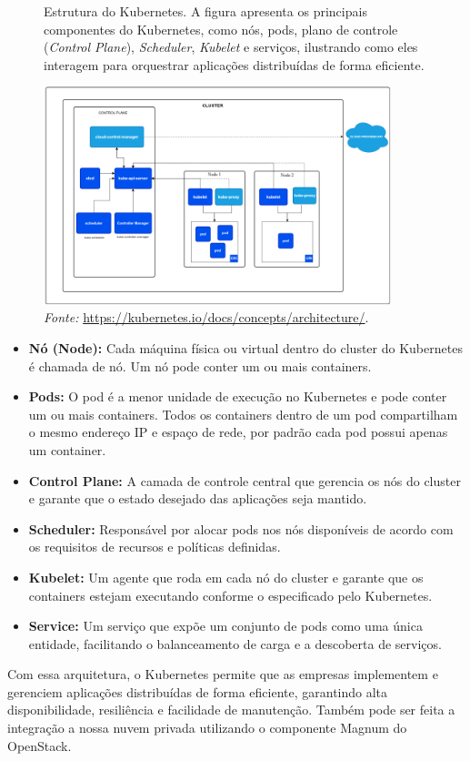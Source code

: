 \begin{figure}[htbp]
  \centering
  \caption{Estrutura do Kubernetes. A figura apresenta os principais componentes do Kubernetes, como nós, pods, plano de controle (\textit{Control Plane}), \textit{Scheduler}, \textit{Kubelet} e serviços, ilustrando como eles interagem para orquestrar aplicações distribuídas de forma eficiente.}
  \includegraphics[width=0.9\textwidth]{images/structure_kubernets.png}
  \caption*{\textit{Fonte:} \url{https://kubernetes.io/docs/concepts/architecture/}.}
  \label{fig:structure_kubernets}
\end{figure}


\begin{itemize}
    \item \textbf{Nó (Node):} Cada máquina física ou virtual dentro do cluster do Kubernetes é chamada de nó. Um nó pode conter um ou mais containers.
    \item \textbf{Pods:} O pod é a menor unidade de execução no Kubernetes e pode conter um ou mais containers. Todos os containers dentro de um pod compartilham o mesmo endereço IP e espaço de rede, por padrão cada pod possui apenas um container.
    \item \textbf{Control Plane:} A camada de controle central que gerencia os nós do cluster e garante que o estado desejado das aplicações seja mantido.
    \item \textbf{Scheduler:} Responsável por alocar pods nos nós disponíveis de acordo com os requisitos de recursos e políticas definidas.
    \item \textbf{Kubelet:} Um agente que roda em cada nó do cluster e garante que os containers estejam executando conforme o especificado pelo Kubernetes.
    \item \textbf{Service:} Um serviço que expõe um conjunto de pods como uma única entidade, facilitando o balanceamento de carga e a descoberta de serviços.
\end{itemize}

Com essa arquitetura, o Kubernetes permite que as empresas implementem e gerenciem aplicações distribuídas de forma eficiente, garantindo alta disponibilidade, resiliência e facilidade de manutenção. Também pode ser feita a integração a nossa nuvem privada utilizando o componente Magnum do OpenStack.

